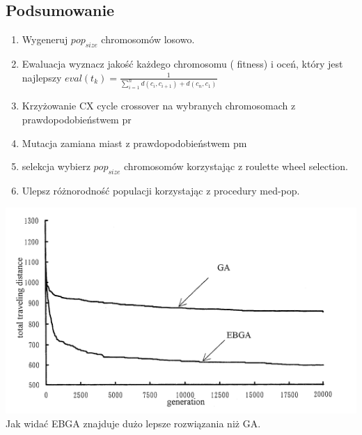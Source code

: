 \documentclass[11pt]{article}
\begin{document}
\subsection{Podsumowanie}
\begin{enumerate}
\item Wygeneruj $pop_{size}$ chromosomów losowo.
\item Ewaluacja wyznacz jakość każdego chromosomu ( fitness) i oceń, który jest najlepszy $eval(t_k) = \frac{1}{\sum_{i=1}^{n}d(c_i,c_{i+1})+d(c_n,c_1)}$
\item Krzyżowanie CX cycle crossover na wybranych chromosomach z prawdopodobieństwem pr
\item Mutacja zamiana miast z prawdopodobieństwem pm
\item selekcja wybierz $pop_{size}$ chromosomów korzystając z roulette wheel selection.
\item Ulepsz różnorodność populacji korzystając z procedury med-pop.
\end{enumerate}
\centering
\includegraphics[scale=0.5]{ebga_ga.png}\\
\flushleft
Jak widać EBGA znajduje dużo lepsze rozwiązania niż GA.
\end{document}
